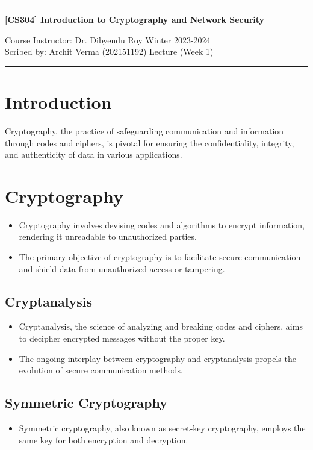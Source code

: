 \documentclass[11pt]{article}
\begin{document}
\noindent
\rule{\textwidth}{1pt}
\begin{center}
    {\bf [CS304] Introduction to Cryptography and Network Security}
\end{center}
Course Instructor: Dr. Dibyendu Roy \hfill Winter 2023-2024\\
Scribed by: Archit Verma (202151192) \hfill Lecture (Week 1)
\\
\rule{\textwidth}{1pt}
\section*{Introduction}
Cryptography, the practice of safeguarding communication and information through codes and ciphers, is pivotal for ensuring the confidentiality, integrity, and authenticity of data in various applications.

\section*{Cryptography}
\begin{itemize}
    \item Cryptography involves devising codes and algorithms to encrypt information, rendering it unreadable to unauthorized parties.
    \item The primary objective of cryptography is to facilitate secure communication and shield data from unauthorized access or tampering.
\end{itemize}

\subsection*{Cryptanalysis}
\begin{itemize}
    \item Cryptanalysis, the science of analyzing and breaking codes and ciphers, aims to decipher encrypted messages without the proper key.
    \item The ongoing interplay between cryptography and cryptanalysis propels the evolution of secure communication methods.
\end{itemize}

\subsection*{Symmetric Cryptography}
\begin{itemize}
    \item Symmetric cryptography, also known as secret-key cryptography, employs the same key for both encryption and decryption.
\end{itemize}
\end{document}
